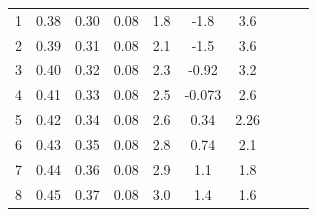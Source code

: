 \begin{center}
\begin{table}[H]
\begin{tabular}{|c|c|c|c|c|c|c|c|c|c|}
\begin{minipage}{20mm}
\end{minipage}\\
\hline
1 & 0.38 & 0.30 & 0.08 & 1.8 & -1.8 & 3.6 & & & \\
2 & 0.39 & 0.31 & 0.08 & 2.1 & -1.5 & 3.6 & & &\\
3 & 0.40 & 0.32 & 0.08 & 2.3 & -0.92 & 3.2 & & &\\
4 & 0.41 & 0.33 & 0.08 & 2.5 & -0.073 & 2.6 & & &\\
5 & 0.42 & 0.34 & 0.08 & 2.6 & 0.34 & 2.26 & & &  \\
6 & 0.43 & 0.35 & 0.08 & 2.8 & 0.74 & 2.1 & & & \\
7 & 0.44 & 0.36 & 0.08 & 2.9 & 1.1 & 1.8 & & &  \\
8 & 0.45 & 0.37 & 0.08 & 3.0 & 1.4 & 1.6 & & &  \\
\hline
\end{tabular}
\end{table}
\end{center}

